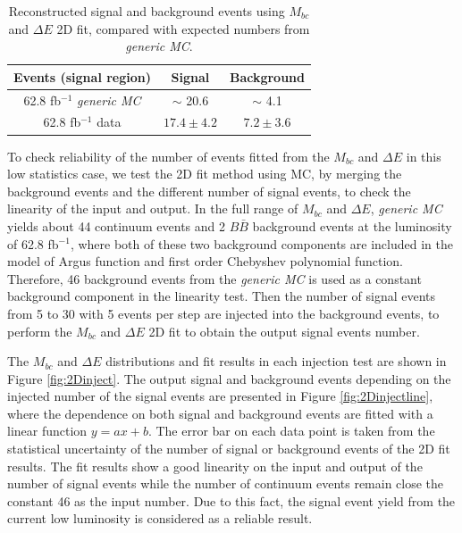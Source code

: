  \begin{table}[htpb]
 	\centering 
 	\caption{Reconstructed signal and background events using $M_{bc}$ and $\Delta E$ 2D fit, compared with expected numbers from \textit{generic MC}.}
 	\label{tab:recoB}
 	\begin{tabular}{|c|c|c|} 
 		\hline
 		Events (signal region) & Signal &  Background\\
 		\hline
 		62.8 fb$^{-1}$ \textit{generic MC} & $\sim$ 20.6 & $\sim$ 4.1\\
 		\hline
 	    62.8 fb$^{-1}$ data & $17.4\pm 4.2$ & $7.2\pm 3.6$\\
 		\hline
 	\end{tabular}
 \end{table}
 
 
To check reliability of the number of events fitted from the $M_{bc}$ and $\Delta E$ in this low statistics case, we test the 2D fit method using MC, by merging the background events and the different number of signal events, to check the linearity of the input and output. In the full range of $M_{bc}$ and $\Delta E$, \textit{generic MC} yields about 44 continuum events and 2 $B\bar{B}$ background events at the luminosity of 62.8 fb$^{-1}$, where both of these two background components are included in the model of Argus function and first order Chebyshev polynomial function. Therefore,  46 background events from the \textit{generic MC} is used as a constant background component in the linearity test. Then the number of signal events from 5 to 30 with 5 events per step are injected into the background events, to perform the $M_{bc}$ and $\Delta E$ 2D fit to obtain the output signal events number.

The $M_{bc}$ and $\Delta E$ distributions and fit results in each injection test are shown in Figure \ref{fig:2Dinject}. The output signal and background events depending on the injected number of the signal events are presented in Figure \ref{fig:2Dinjectline}, where the dependence on both signal and background events are fitted with a linear function $y = ax+b$. The error bar on each data point is taken from the statistical uncertainty of the number of signal or background events of the 2D fit results. The fit results show a good linearity on the input and output of the number of signal events while the number of continuum events remain close the constant 46 as the input number. Due to this fact, the signal event yield from the current low luminosity is considered as a reliable result. 


